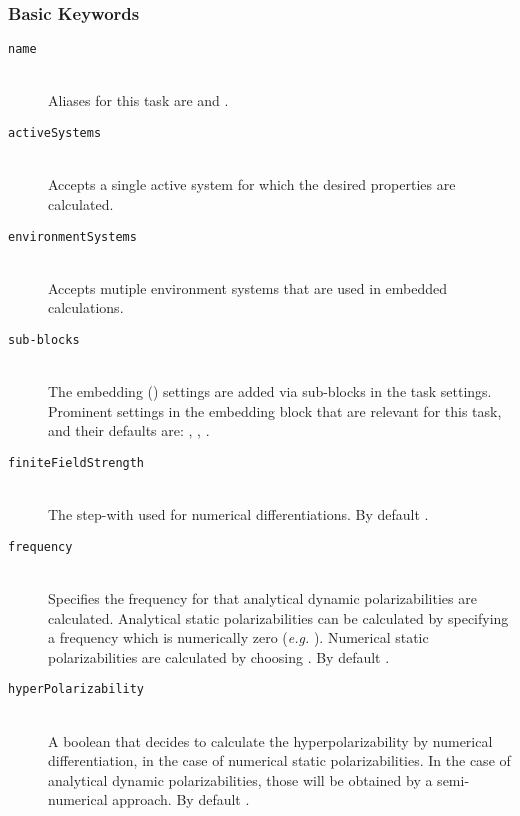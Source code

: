 \subsubsection{Basic Keywords}
\begin{description}
	\item [\texttt{name}]\hfill \\
	Aliases for this task are  and .
	\item [\texttt{activeSystems}]\hfill \\
	Accepts a single active system for which the desired properties are calculated.
	\item [\texttt{environmentSystems}]\hfill \\
	Accepts mutiple environment systems that are used in embedded calculations.
	\item [\texttt{sub-blocks}]\hfill \\
	The embedding () settings are added via sub-blocks in the task settings.
	Prominent settings in the embedding block that are relevant for this task, and their defaults are:
	, , .
    \item [\texttt{finiteFieldStrength}]\hfill \\
    The step-with used for numerical differentiations. By default .
    \item [\texttt{frequency}]\hfill \\
    Specifies the frequency for that analytical dynamic polarizabilities are calculated. Analytical static polarizabilities
    can be calculated by specifying a frequency which is numerically zero (\emph{e.g.} ). Numerical static polarizabilities
    are calculated by choosing . By default .
    \item [\texttt{hyperPolarizability}]\hfill \\
    A boolean that decides to calculate the hyperpolarizability by numerical differentiation, in the case of numerical static polarizabilities. In the case of analytical dynamic polarizabilities, those will be obtained by a semi-numerical approach. By default .
\end{description}

